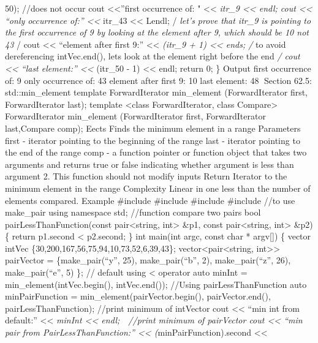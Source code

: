 50); //does not occur cout \textless\textless{}''first occurrence of: "
\textless\textless{} \emph{itr\_9 \textless\textless{} endl; cout
\textless\textless{} ``only occurrence of:'' \textless\textless{}
}itr\_43 \textless\textless{} Lendl; /\emph{ let's prove that itr\_9 is
pointing to the first occurrence of 9 by looking at the element after 9,
which should be 10 not 43 }/ cout \textless\textless{} ``element after
first 9:'' \textless\textless{} \emph{(itr\_9 + 1) \textless\textless{}
ends; /} to avoid dereferencing intVec.end(), lets look at the element
right before the end \emph{/ cout \textless\textless{} ``last element:''
\textless\textless{} }(itr\_50 - 1) \textless\textless{} endl; return 0;
\} Output first occurrence of: 9 only occurrence of: 43 element after
first 9: 10 last element: 48 Section 62.5: std::min\_element template
ForwardIterator min\_element (ForwardIterator first, ForwardIterator
last); template \textless class ForwardIterator, class
Compare\textgreater{} ForwardIterator min\_element (ForwardIterator
first, ForwardIterator last,Compare comp); Eects Finds the minimum
element in a range Parameters first - iterator pointing to the beginning
of the range last - iterator pointing to the end of the range comp - a
function pointer or function object that takes two arguments and returns
true or false indicating whether argument is less than argument 2. This
function should not modify inputs Return Iterator to the minimum element
in the range Complexity Linear in one less than the number of elements
compared. Example \#include \#include \#include \#include //to use
make\_pair using namespace std; //function compare two pairs bool
pairLessThanFunction(const pair\textless string, int\textgreater{} \&p1,
const pair\textless string, int\textgreater{} \&p2) \{ return p1.second
\textless{} p2.second; \} int main(int argc, const char * argv{[}{]}) \{
vector intVec \{30,200,167,56,75,94,10,73,52,6,39,43\};
vector\textless pair\textless string, int\textgreater\textgreater{}
pairVector = \{make\_pair(``y'', 25), make\_pair(``b'', 2),
make\_pair(``z'', 26), make\_pair(``e'', 5) \}; // default using
\textless{} operator auto minInt = min\_element(intVec.begin(),
intVec.end()); //Using pairLessThanFunction auto minPairFunction =
min\_element(pairVector.begin(), pairVector.end(),
pairLessThanFunction); //print minimum of intVector cout
\textless\textless{} ``min int from default:'' \textless\textless{}
\emph{minInt \textless\textless{} endl;  //print minimum of pairVector
cout \textless\textless{} ``min pair from PairLessThanFunction:''
\textless\textless{} (}minPairFunction).second \textless\textless{}
